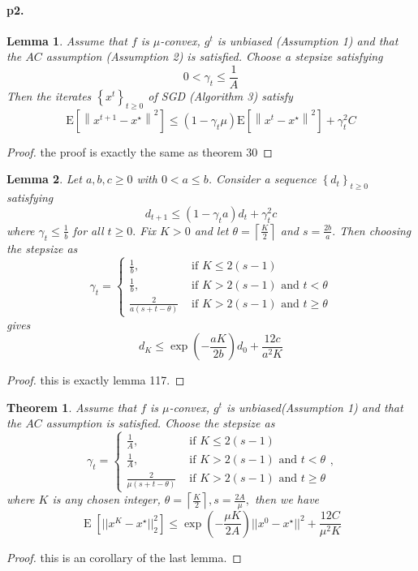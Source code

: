 \documentclass[12pt,a4paper]{article}
\newtheorem*{lemma}{Lemma}
\newtheorem*{theorem}{Theorem}
\DeclareMathOperator{\E}{\mathrm{E}}
\begin{document}
	\paragraph{p2.}
	\begin{lemma}
		Assume that $f$ is $\mu$-convex, $g^{t}$ is unbiased (Assumption 1) and that the $A C$ assumption (Assumption 2) is satisfied. Choose a stepsize satisfying
		$$
		0<\gamma_t \leq \frac{1}{A}
		$$
		Then the iterates $\left\{x^{t}\right\}_{t \geq 0}$ of SGD (Algorithm 3) satisfy
		$$
		\mathrm{E}\left[\left\|x^{t+1}-x^{\star}\right\|^{2}\right] \leq(1-\gamma_t \mu)\mathrm{E}\left[\left\|x^{t}-x^{\star}\right\|^{2}\right]+\gamma_t^2C
		$$
	\end{lemma}
	\begin{proof}
		the proof is exactly the  same as theorem 30
	\end{proof}
	\begin{lemma}
		Let $a, b, c \geq 0$ with $0<a \leq b$. Consider a sequence $\left\{d_{t}\right\}_{t \geq 0}$ satisfying
		$$
		d_{t+1} \leq\left(1-\gamma_{t} a\right) d_{t}+\gamma_{t}^{2} c
		$$
		where $\gamma_{t} \leq \frac{1}{b}$ for all $t \geq 0 .$ Fix $K>0$ and let $\theta=\left\lceil\frac{K}{2}\right\rceil$ and $s=\frac{2 b}{a} .$ Then choosing the stepsize as
		$$
		\gamma_{t}= \begin{cases}\frac{1}{b}, & \text { if } K \leq 2(s-1) \\ \frac{1}{b}, & \text { if } K>2(s-1) \text { and } t<\theta \\ \frac{2}{a(s+t-\theta)} & \text { if } K>2(s-1) \text { and } t \geq \theta\end{cases}
		$$
		gives
		$$
		d_{K} \leq \exp \left(-\frac{a K}{2 b}\right) d_{0}+\frac{12 c}{a^{2} K}
		$$
	\end{lemma}
	\begin{proof}
		this is exactly lemma 117.
	\end{proof}
	\begin{theorem}
		Assume that $f$ is $\mu$-convex, $g^{t}$ is unbiased(Assumption 1) and that the $A C$ assumption is satisfied. Choose the stepsize as 
		$$
		\gamma_{t}= \begin{cases}\frac{1}{A}, & \text { if } K \leq 2(s-1) \\ \frac{1}{A}, & \text { if } K>2(s-1) \text { and } t<\theta \\ \frac{2}{\mu(s+t-\theta)} & \text { if } K>2(s-1) \text { and } t \geq \theta\end{cases},
		$$
		where $K$ is any chosen integer, $\theta=\left\lceil\frac{K}{2}\right\rceil,s=\frac{2 A}{\mu},$
		then we have 
		$$
		\E\left[||x^K-x^{\star}||_2^2\right]\leq\exp\left(-\frac{\mu K}{2A}\right)||x^0-x^{\star}||^2+\frac{12C}{\mu^2K}
		$$
	\end{theorem}
	\begin{proof}
		this is an corollary of the last lemma.
	\end{proof}
\end{document}
